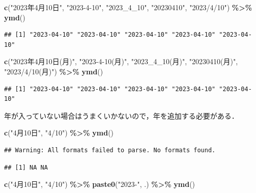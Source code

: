 \documentclass[
]{article}
\newenvironment{Shaded}{\begin{snugshade}}{\end{snugshade}}
\newcommand{\FunctionTok}[1]{\textcolor[rgb]{0.13,0.29,0.53}{\textbf{#1}}}
\newcommand{\NormalTok}[1]{#1}
\newcommand{\SpecialCharTok}[1]{\textcolor[rgb]{0.81,0.36,0.00}{\textbf{#1}}}
\newcommand{\StringTok}[1]{\textcolor[rgb]{0.31,0.60,0.02}{#1}}
\begin{document}
\begin{Shaded}
\begin{Highlighting}[]
\FunctionTok{c}\NormalTok{(}\StringTok{"2023年4月10日"}\NormalTok{, }\StringTok{"2023{-}4{-}10"}\NormalTok{, }\StringTok{"2023\_4\_10"}\NormalTok{, }\StringTok{"20230410"}\NormalTok{, }\StringTok{"2023/4/10"}\NormalTok{) }\SpecialCharTok{\%\textgreater{}\%}
  \FunctionTok{ymd}\NormalTok{()}
\end{Highlighting}
\end{Shaded}

\begin{verbatim}
## [1] "2023-04-10" "2023-04-10" "2023-04-10" "2023-04-10" "2023-04-10"
\end{verbatim}

\begin{Shaded}
\begin{Highlighting}[]
\FunctionTok{c}\NormalTok{(}\StringTok{"2023年4月10日(月)"}\NormalTok{, }\StringTok{"2023{-}4{-}10(月)"}\NormalTok{, }\StringTok{"2023\_4\_10(月)"}\NormalTok{, }\StringTok{"20230410(月)"}\NormalTok{, }\StringTok{"2023/4/10(月)"}\NormalTok{) }\SpecialCharTok{\%\textgreater{}\%}
  \FunctionTok{ymd}\NormalTok{()}
\end{Highlighting}
\end{Shaded}

\begin{verbatim}
## [1] "2023-04-10" "2023-04-10" "2023-04-10" "2023-04-10" "2023-04-10"
\end{verbatim}

年が入っていない場合はうまくいかないので，年を追加する必要がある．

\begin{Shaded}
\begin{Highlighting}[]
\FunctionTok{c}\NormalTok{(}\StringTok{"4月10日"}\NormalTok{, }\StringTok{"4/10"}\NormalTok{) }\SpecialCharTok{\%\textgreater{}\%}
  \FunctionTok{ymd}\NormalTok{()}
\end{Highlighting}
\end{Shaded}

\begin{verbatim}
## Warning: All formats failed to parse. No formats found.
\end{verbatim}

\begin{verbatim}
## [1] NA NA
\end{verbatim}

\begin{Shaded}
\begin{Highlighting}[]
\FunctionTok{c}\NormalTok{(}\StringTok{"4月10日"}\NormalTok{, }\StringTok{"4/10"}\NormalTok{) }\SpecialCharTok{\%\textgreater{}\%}
  \FunctionTok{paste0}\NormalTok{(}\StringTok{"2023{-}"}\NormalTok{, .) }\SpecialCharTok{\%\textgreater{}\%}
  \FunctionTok{ymd}\NormalTok{()}
\end{Highlighting}
\end{Shaded}
\end{document}
